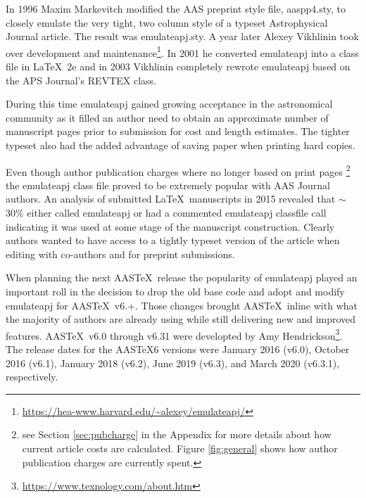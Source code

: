 \documentclass[linenumbers,trackchanges]{aastex7}
\newcommand\aastex{AAS\TeX}
\newcommand\latex{La\TeX}
\begin{document}
In 1996 Maxim Markevitch modified the AAS preprint style file, aaspp4.sty,
to closely emulate the very tight, two column style of a typeset
Astrophysical Journal article.  The result was emulateapj.sty. A year
later Alexey Vikhlinin took over development and maintenance\footnote{\url{https://hea-www.harvard.edu/~alexey/emulateapj/}}. In 2001 he
converted emulateapj into a class file in \latex\ 2e and in 2003 Vikhlinin
completely rewrote emulateapj based on the APS Journal's REVTEX class.

During this time emulateapj gained growing acceptance in the astronomical
community as it filled an author need to obtain an approximate number of
manuscript pages prior to submission for cost and length estimates. The
tighter typeset also had the added advantage of saving paper when printing 
hard copies.

\begin{figure*}[ht!]
\caption{The AAS journals are operated as a nonprofit venture, and author charges fairly recapture costs for the services provided in the publishing process. The chart above breaks down the services that author charges go toward. The AAS Journals' Business Model is outlined in a \href{https://aas.org/posts/news/2023/08/aas-open-access-publishing-model-open-transparent-and-fair}{2023 post}.
\label{fig:general}}
\end{figure*}

Even though author publication charges where no longer based on print pages
\footnote{see Section \ref{sec:pubcharge} in the Appendix for more details
about how current article costs are calculated. Figure \ref{fig:general} shows
how author publication charges are currently spent.} the emulateapj class file
proved to be extremely popular with AAS Journal authors.  An 
analysis of submitted \latex\ manuscripts in 2015 revealed that $\sim$30\%
either called emulateapj or had a commented emulateapj classfile call
indicating it was used at some stage of the manuscript construction.
Clearly authors wanted to have access to a tightly typeset version of the
article when editing with co-authors and for preprint submissions.

When planning the next \aastex\ release the popularity of emulateapj played
an important roll in the decision to drop the old base code and adopt and
modify emulateapj for \aastex\ v6.+.  Those changes brought \aastex\
inline with what the majority of authors are already using while still
delivering new and improved features.  \aastex\ v6.0 through v6.31 were
developted by Amy Hendrickson\footnote{\url{https://www.texnology.com/about.htm}}.
The release dates for the \aastex 6 versions were January 2016 (v6.0),
October 2016 (v6.1), January 2018 (v6.2), June 2019 (v6.3), and March 2020
(v6.3.1), respectively.
\end{document}
